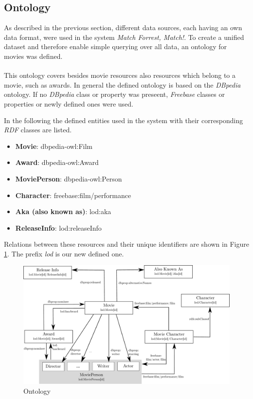 \subsection{Ontology}
\label{subsec_method_ontology}

As described in the previous section, different data sources, each having an own data format, were used in the system \emph{Match Forrest, Match!}.
To create a unified dataset and therefore enable simple querying over all data, an ontology for movies was defined.
\\ \\
This ontology covers besides movie resources also resources which belong to a movie, such as awards.
In general the defined ontology is based on the \textit{DBpedia} ontology.
If no \textit{DBpedia} class or property was preseent, \textit{Freebase} classes or properties or newly defined ones were used.

In the following the defined entities used in the system with their corresponding \textit{RDF} classes are listed.
\begin{itemize}
	\item \textbf{Movie}: dbpedia-owl:Film
	\item \textbf{Award}: dbpedia-owl:Award
	\item \textbf{MoviePerson}: dbpedia-owl:Person
	\item \textbf{Character}: freebase:film/performance
	\item \textbf{Aka (also known as)}: lod:aka
	\item \textbf{ReleaseInfo}: lod:releaseInfo
\end{itemize}
Relations between these resources and their unique identifiers are shown in Figure \ref{fig_ontology}.
The prefix \textit{lod} is our new defined one.

\begin{figure}[h!]
\includegraphics[width=\textwidth]{images/ontology.pdf}
\caption{Ontology}
\label{fig_ontology}
\end{figure}

